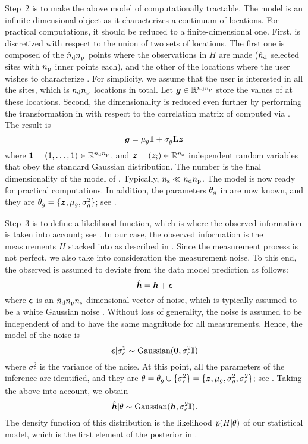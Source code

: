 Step~2 is to make the above model of \g computationally tractable. The model is
an infinite-dimensional object as it characterizes a continuum of locations. For
practical computations, it should be reduced to a finite-dimensional one. First,
\g is discretized with respect to the union of two sets of locations. The first
one is composed of the ${\hat{n}_\mathrm{d}} {n_\mathrm{p}}$ points where the observations in $H$ are made
(${\hat{n}_\mathrm{d}}$ selected sites with ${n_\mathrm{p}}$ inner points each), and the other of the
locations where the user wishes to characterize \g. For simplicity, we assume
that the user is interested in all the sites, which is ${n_\mathrm{d}} {n_\mathrm{p}}$ locations in
total. Let $\boldsymbol{g} \in \mathbb{R}^{{n_\mathrm{d}} {n_\mathrm{p}}}$ store the values of \g at these locations.
Second, the dimensionality is reduced even further by performing the
transformation in  with respect to the correlation
matrix of \vg computed via . The result is
\begin{equation} \elab{inference-reduction}
  \vg = \mu_\g \v{1} + \sigma_\g \m{L} \vz
\end{equation}
where $\boldsymbol{1} = (1, \dots, 1) \in \mathbb{R}^{{n_\mathrm{d}} {n_\mathrm{p}}}$, and $\boldsymbol{z} = (z_i) \in
\mathbb{R}^{n_\mathrm{z}}$ independent random variables that obey the standard Gaussian
distribution. The number \nz is the final dimensionality of the model of \g.
Typically, ${n_\mathrm{z}} \ll {n_\mathrm{d}} {n_\mathrm{p}}$. The model is now ready for practical computations.
In addition, the parameters $\theta_g$ in  are now known, and
they are $\theta_g = \{ \boldsymbol{z}, \mu_g, \sigma^2_g \}$; see
.

Step~3 is to define a likelihood function, which is where the observed
information is taken into account; see . In our case,
the observed information is the measurements $H$ stacked into \hvh as described
in . Since the measurement process is not perfect, we
also take into consideration the measurement noise. To this end, the observed
\hvh is assumed to deviate from the data model prediction \vh as follows:
\[
  \hat{\boldsymbol{h}} = \boldsymbol{h} + \boldsymbol{\epsilon}
\]
where $\boldsymbol{\epsilon}$ is an ${\hat{n}_\mathrm{d}} {n_\mathrm{p}} {n_\mathrm{s}}$-dimensional vector of noise, which is
typically assumed to be a white Gaussian noise \cite{rasmussen2006,
marzouk2009}. Without loss of generality, the noise is assumed to be independent
of \g and to have the same magnitude for all measurements. Hence, the model of
the noise is
\[
  \boldsymbol{\epsilon} | \sigma^2_\epsilon \sim \text{Gaussian}(\boldsymbol{0}, \sigma^2_\epsilon \mathbf{I})
\]
where $\sigma^2_\epsilon$ is the variance of the noise. At this point, all the
parameters of the inference are identified, and they are $\theta = \theta_g \cup \{
\sigma_\epsilon^2 \} = \{ \boldsymbol{z}, \mu_g, \sigma_g^2, \sigma_\epsilon^2 \}$; see
. Taking the above into account, we obtain
\begin{equation} \elab{inference-likelihood}
  \hvh | \t \sim \text{Gaussian}(\vh, \sigma_\epsilon^2 \m{I}).
\end{equation}
The density function of this distribution is the likelihood $p(H | \theta)$ of our
statistical model, which is the first element of the posterior in
.

